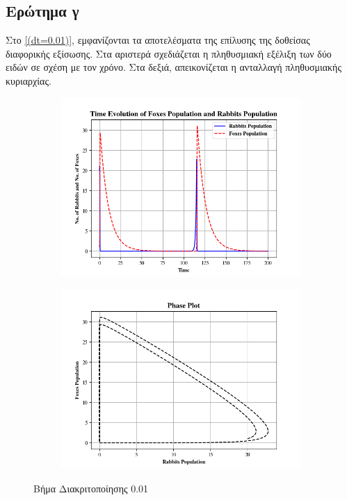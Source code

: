 \documentclass{article}
\begin{document}
\subsection{Ερώτημα γ}
Στο \autoref{(dt=0.01)}, εμφανίζονται τα αποτελέσματα της επίλυσης της δοθείσας διαφορικής εξίσωσης. Στα αριστερά σχεδιάζεται η πληθυσμιακή εξέλιξη των δύο ειδών σε σχέση με τον χρόνο. Στα δεξιά, απεικονίζεται η ανταλλαγή πληθυσμιακής κυριαρχίας.
\vspace*{\fill}
\begin{figure}[H]
    \centering
	\begin{adjustbox}{center}

		\begin{subfigure}[c]{0.8\textwidth}    
			\includegraphics[width=1\textwidth,height=\textheight,keepaspectratio]{media/2/dt=0.01/Figure_1.png}
		\end{subfigure}
		
    	\begin{subfigure}[c]{.8\textwidth}
			\includegraphics[width=1\textwidth,height=\textheight,keepaspectratio]{media/2/dt=0.01/Figure_2.png}
		\end{subfigure}
	\end{adjustbox}
\caption{Βήμα Διακριτοποίησης 0.01}
\label{(dt=0.01)}
\end{figure}
\end{document}
